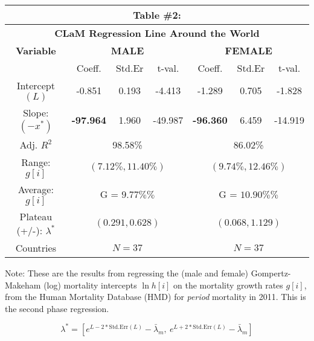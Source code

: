 \documentclass[12pt, titlepage]{article}%
\begin{document}
\clearpage
\begin{table}
\begin{center}
\begin{tabular}{||c||c|c|c|c|c|c||}\hline\hline
\multicolumn{7}{||c||}{Table \#2:} \\ \hline
\multicolumn{7}{||c||}{{\bf CLaM Regression Line Around the World}} \\ \hline
{\bf Variable} & \multicolumn{3}{|c|}{{\bf MALE}} & \multicolumn{3}{|c||}{{\bf FEMALE}} \\ \hline
& Coeff. & Std.Er & t-val. & Coeff. & Std.Er & t-val.  \\ \hline
Intercept $(L)$ & -0.851 & 0.193 & -4.413 & -1.289 & 0.705 & -1.828 \\ \hline
Slope: $(-x^{*})$ & {\bf-97.964} & 1.960 & -49.987 & {\bf-96.360} & 6.459 & -14.919 \\ \hline
Adj. $R^2$ & \multicolumn{3}{|c|}{98.58\%} & \multicolumn{3}{|c||}{86.02\%} \\ \hline
Range: $g[i]$ & \multicolumn{3}{|c|}{$(7.12\%, 11.40\%)$} & \multicolumn{3}{|c||}{$(9.74\%, 12.46\%)$} \\ \hline
Average: $g[i]$ & \multicolumn{3}{|c|}{G \; = \; $9.77\%\%$} & \multicolumn{3}{|c||}{G \; = \; $10.90\%\%$} \\ \hline
Plateau (+/-): $\lambda^{*}$ & \multicolumn{3}{|c|}{$ (0.291, 0.628)$} & \multicolumn{3}{|c||}{$ (0.068, 1.129)$} \\ \hline
Countries & \multicolumn{3}{|c|}{$N=37$} & \multicolumn{3}{|c||}{$N=37$} \\ \hline
\end{tabular}\label{tab3}\end{center}Note: These are the results from regressing the (male and female) Gompertz-Makeham (log) mortality intercepts $\ln h[i]$ on the mortality growth rates $g[i]$, from the Human Mortality Database (HMD) for {\em period} mortality in 2011. This is the second phase regression.
\end{table}

$$
    \lambda^{*} = [ e^{L-2*\text{Std.Err}(L)} - \bar{\lambda}_m, \ e^{L+2*\text{Std.Err}(L)} - \bar{\lambda}_m ]
$$
\end{document}
